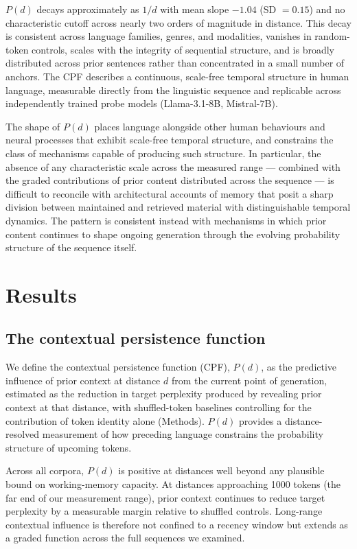 \documentclass[11pt]{article}
\begin{document}
$P(d)$ decays approximately as $1/d$ with mean slope $-1.04$ (SD $=0.15$) and no
characteristic cutoff across nearly two orders of magnitude in distance. This decay
is consistent across language families, genres, and modalities, vanishes in
random-token controls, scales with the integrity of sequential structure, and is
broadly distributed across prior sentences rather than concentrated in a small number
of anchors. The CPF describes a continuous, scale-free temporal
structure in human language, measurable directly from the linguistic sequence and
replicable across independently trained probe models
(Llama-3.1-8B, Mistral-7B).

The shape of $P(d)$ places language alongside other human behaviours and neural
processes that exhibit scale-free temporal structure, and constrains the class of
mechanisms capable of producing such structure. In particular, the absence of any
characteristic scale across the measured range --- combined with the graded
contributions of prior content distributed across the sequence --- is difficult to
reconcile with architectural accounts of memory that posit a sharp division between
maintained and retrieved material with distinguishable temporal dynamics. The pattern
is consistent instead with mechanisms in which prior content continues to shape
ongoing generation through the evolving probability structure of the sequence itself.

\section{Results}

\subsection{The contextual persistence function}

We define the contextual persistence function (CPF), $P(d)$, as the predictive influence of prior
context at distance $d$ from the current point of generation, estimated as the
reduction in target perplexity produced by revealing prior context at that distance,
with shuffled-token baselines controlling for the contribution of token identity
alone (Methods). $P(d)$ provides a distance-resolved measurement of how preceding
language constrains the probability structure of upcoming tokens.

Across all corpora, $P(d)$ is positive at distances well beyond any plausible bound
on working-memory capacity. At distances approaching 1000 tokens (the far end of our
measurement range), prior context continues to reduce target perplexity by a measurable
margin relative to shuffled controls. Long-range contextual influence is therefore not confined to a recency
window but extends as a graded function across the full sequences we examined.
\end{document}
